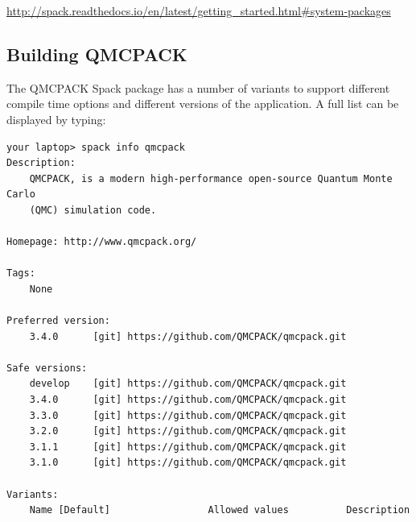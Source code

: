 \url{http://spack.readthedocs.io/en/latest/getting_started.html#system-packages}

\subsection{Building QMCPACK}
The QMCPACK Spack package has a number of variants to support different compile time
options and different versions of the application. A full list can be displayed by typing:
\verbatimfont{\footnotesize}
\begin{verbatim}
your laptop> spack info qmcpack
Description:
    QMCPACK, is a modern high-performance open-source Quantum Monte Carlo
    (QMC) simulation code.

Homepage: http://www.qmcpack.org/

Tags:
    None

Preferred version:
    3.4.0      [git] https://github.com/QMCPACK/qmcpack.git

Safe versions:
    develop    [git] https://github.com/QMCPACK/qmcpack.git
    3.4.0      [git] https://github.com/QMCPACK/qmcpack.git
    3.3.0      [git] https://github.com/QMCPACK/qmcpack.git
    3.2.0      [git] https://github.com/QMCPACK/qmcpack.git
    3.1.1      [git] https://github.com/QMCPACK/qmcpack.git
    3.1.0      [git] https://github.com/QMCPACK/qmcpack.git

Variants:
    Name [Default]                 Allowed values          Description



\end{verbatim}
